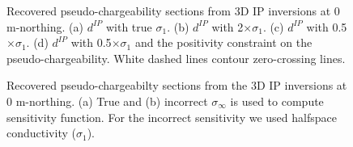 \documentclass[extra,mreferee]{gji}
\newcommand{\siginf}{\sigma_\infty}
\newcommand{\dip}{d^{IP}}
\begin{document}
\begin{figure}
  \caption{Recovered pseudo-chargeability sections from 3D IP inversions at 0 m-northing. (a) $\dip$ with true $\sigma_1$. (b) $\dip$ with 2$\times \sigma_1$. (c) $\dip$ with 0.5$\times \sigma_1$. (d) $\dip$ with 0.5$\times \sigma_1$ and the positivity constraint on the pseudo-chargeability. White dashed lines contour zero-crossing lines.}
  \label{F:Regional_IPInv}
\end{figure}



\begin{figure}
  \caption{Recovered pseudo-chargeabilty sections from the 3D IP inversions at 0 m-northing.  (a) True and (b) incorrect $\siginf$ is used to compute sensitivity function. For the incorrect sensitivity we used halfspace conductivity ($\sigma_1$).}
  \label{F:True_vs_approx_sensitivity}
\end{figure}
\end{document}
